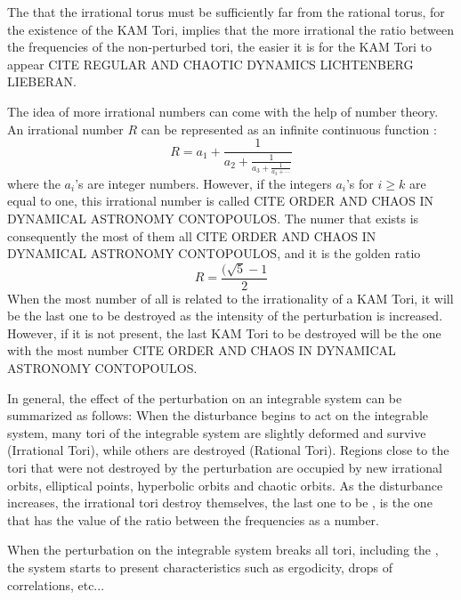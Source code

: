 The that the irrational torus must be sufficiently far from the rational torus, for the existence of the KAM Tori, implies that the more irrational the ratio between the frequencies of the non-perturbed tori, the easier it is for the KAM Tori to appear CITE REGULAR AND CHAOTIC DYNAMICS LICHTENBERG LIEBERAN.\par

The idea of more irrational numbers can come with the help of number theory. An irrational number $R$ can  be represented as an infinite continuous function \cite{ottChaosDynamicalSystems2002}:
\begin{equation}
R=a_1+\frac{1}{a_2+\frac{1}{a_3+\frac{1}{a_3+ \cdots}}}
\end{equation}
where the $a_i$'s are integer numbers. However, if the integers $a_i$'s for $i\geq k$ are equal to one, this irrational number is called  CITE ORDER AND CHAOS IN DYNAMICAL ASTRONOMY CONTOPOULOS. The  numer that exists is consequently the most  of them all CITE ORDER AND CHAOS IN DYNAMICAL ASTRONOMY CONTOPOULOS, and it is the golden ratio
\begin{equation}
R=\frac{(\sqrt{5}-1}{2}
\end{equation}
When the most  number of all is related to the irrationality of a KAM Tori, it will be the last one to be destroyed as the intensity of the perturbation is increased. However, if it is not present, the last KAM Tori to be destroyed will be the one with the most  number CITE ORDER AND CHAOS IN DYNAMICAL ASTRONOMY CONTOPOULOS.\par

In general, the effect of the perturbation on an integrable system can be summarized as follows: When the disturbance begins to act on the integrable system, many tori of the integrable system are slightly deformed and survive (Irrational Tori), while others are destroyed (Rational Tori). Regions close to the tori that were not destroyed by the perturbation are occupied by new irrational orbits, elliptical points, hyperbolic orbits and chaotic orbits. As the disturbance increases, the irrational tori destroy themselves, the last one to be , is the one that has the value of the ratio between the frequencies as a  number.\par

When the perturbation on the integrable system breaks all tori, including the , the system starts to present characteristics such as ergodicity, drops of correlations, etc...



